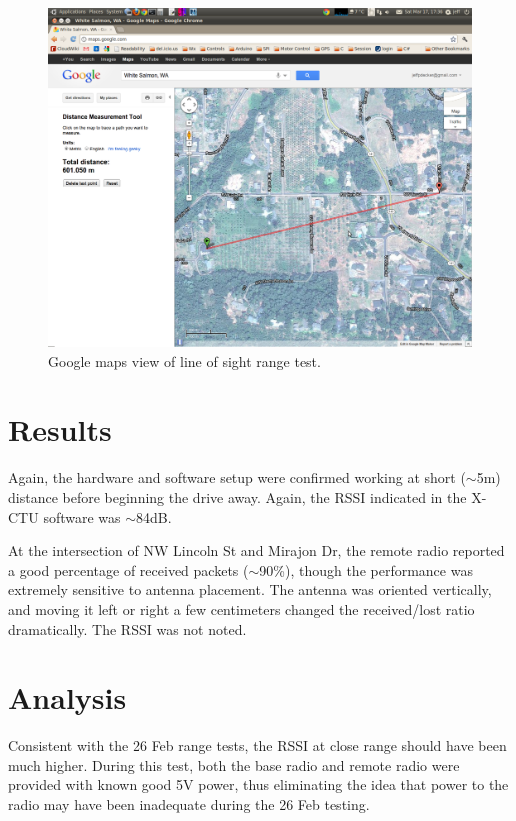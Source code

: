 \documentclass[11pt,letterpaper]{article}
\begin{document}
\begin{figure}[ht]
\begin{center}
\includegraphics[scale=0.45, trim = 160mm 70mm 30mm 140mm, clip]{600mRangeTest.png}
\centering
\caption{Google maps view of line of sight range test.}
\label{googleMaps}
\end{center}
\end{figure}


\section{Results}

Again, the hardware and software setup were confirmed working at short ($\sim$5m) distance before beginning the drive away.  Again, the RSSI indicated in the X-CTU software was $\sim$84dB.

At the intersection of NW Lincoln St and Mirajon Dr, the remote radio reported a good percentage of received packets ($\sim$90\%), though the performance was extremely sensitive to antenna placement.  The antenna was oriented vertically, and moving it left or right a few centimeters changed the received/lost ratio dramatically.  The RSSI was not noted.

\section{Analysis}

Consistent with the 26 Feb range tests, the RSSI at close range should have been much higher.  During this test, both the base radio and remote radio were provided with known good 5V power, thus eliminating the idea that power to the radio may have been inadequate during the 26 Feb testing.
\end{document}
